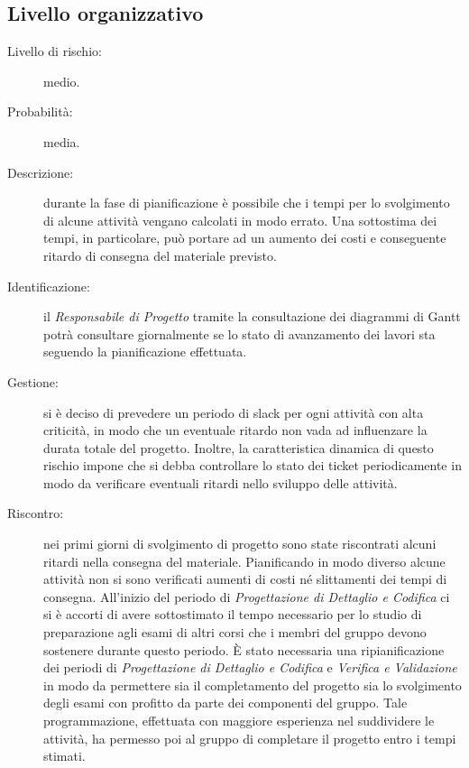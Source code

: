 \subsection{Livello organizzativo}
\begin{description}
	\item[Livello di rischio:] medio.
	\item[Probabilità:] media.
	\item[Descrizione:] durante la fase di pianificazione è possibile che i tempi per lo svolgimento di alcune attività vengano calcolati in modo errato. Una sottostima dei tempi, in particolare, può portare ad un aumento dei costi e conseguente ritardo di consegna del materiale previsto. 
	\item[Identificazione:] il \textit{Responsabile di Progetto} tramite la consultazione dei diagrammi di \gls{Gantt} potrà consultare giornalmente se lo stato di avanzamento dei lavori sta seguendo la pianificazione effettuata.
	\item[Gestione:] si è deciso di prevedere un periodo di \gls{slack} per ogni attività con alta criticità, in modo che un eventuale ritardo non vada ad influenzare la durata totale del progetto. Inoltre, la caratteristica dinamica di questo rischio impone che si debba controllare lo stato dei \gls{ticket} periodicamente in modo da verificare eventuali ritardi nello sviluppo delle attività. 
	\item[Riscontro:] nei primi giorni di svolgimento di progetto sono state riscontrati alcuni ritardi nella consegna del materiale. Pianificando in modo diverso alcune attività non si sono verificati aumenti di costi né slittamenti dei tempi di consegna. All'inizio del periodo di \textit{Progettazione di Dettaglio e Codifica} ci si è accorti di avere sottostimato il tempo necessario per lo studio di preparazione agli esami di altri corsi che i membri del gruppo devono sostenere durante questo periodo. È stato necessaria una ripianificazione dei periodi di \textit{Progettazione di Dettaglio e Codifica} e \textit{Verifica e Validazione} in modo da permettere sia il completamento del progetto sia lo svolgimento degli esami con profitto da parte dei componenti del gruppo. Tale programmazione, effettuata con maggiore esperienza nel suddividere le attività, ha permesso poi al gruppo di completare il progetto entro i tempi stimati. 
\end{description}

